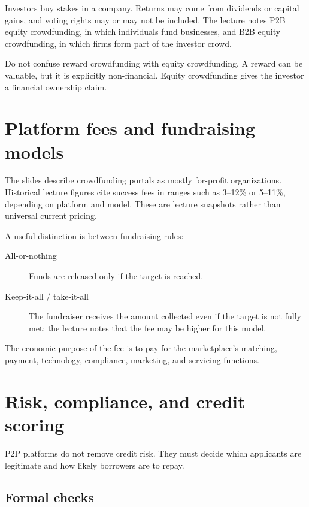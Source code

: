 Investors buy stakes in a company. Returns may come from dividends or capital gains, and voting rights may or may not be included. The lecture notes P2B equity crowdfunding, in which individuals fund businesses, and B2B equity crowdfunding, in which firms form part of the investor crowd.

\begin{pitfall}
Do not confuse reward crowdfunding with equity crowdfunding. A reward can be valuable, but it is explicitly non-financial. Equity crowdfunding gives the investor a financial ownership claim.
\end{pitfall}

\section{Platform fees and fundraising models}

The slides describe crowdfunding portals as mostly for-profit organizations. Historical lecture figures cite success fees in ranges such as 3--12\% or 5--11\%, depending on platform and model. These are lecture snapshots rather than universal current pricing.

A useful distinction is between fundraising rules:

\begin{description}
  \item[All-or-nothing] Funds are released only if the target is reached.
  \item[Keep-it-all / take-it-all] The fundraiser receives the amount collected even if the target is not fully met; the lecture notes that the fee may be higher for this model.
\end{description}

The economic purpose of the fee is to pay for the marketplace's matching, payment, technology, compliance, marketing, and servicing functions.

\section{Risk, compliance, and credit scoring}

P2P platforms do not remove credit risk. They must decide which applicants are legitimate and how likely borrowers are to repay.

\subsection{Formal checks}

